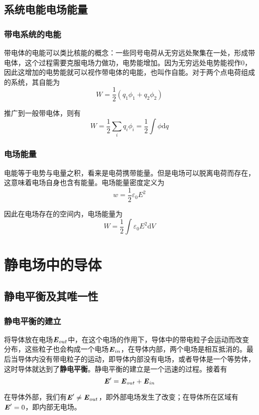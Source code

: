 \documentclass[UTF8,openany]{book}
\begin{document}
	\section{系统电能\quad 电场能量}
	\subsection{带电系统的电能}
	\par 带电体的电能可以类比核能的概念：一些同号电荷从无穷远处聚集在一处，形成带电体，这个过程需要克服电场力做功，电势能增加。因为无穷远处电势能视作0，因此这增加的电势能就可以视作带电体的电能，也叫作自能。对于两个点电荷组成的系统，其自能为
	$$W=\frac{1}{2}(q_1\phi_1+q_2\phi_2)$$
	\par 推广到一般带电体，则有
	$$W=\frac{1}{2}\sum_{i}q_i\phi_i=\frac{1}{2}\int\phi\mathrm{d}q$$
	\subsection{电场能量}
	\par 电能等于电势与电量之积，看来是电荷携带能量。但是电场可以脱离电荷而存在，这意味着电场自身也含有能量。电场能量密度定义为
	$$w=\frac{1}{2}\varepsilon_0E^2$$
	\par 因此在电场存在的空间内，电场能量为
	$$W=\frac{1}{2}\int\varepsilon_0E^2\mathrm{d}V$$
	
	\chapter{静电场中的导体}
	\section{静电平衡及其唯一性}
	\subsection{静电平衡的建立}
	\par 将导体放在电场$\textbf{\textit{E}}_{out}$中，在这个电场的作用下，导体中的带电粒子会运动而改变分布，这些粒子也会构成一个电场$\textbf{\textit{E}}_{in}$，在导体内部，两个电场是相互抵消的。最后当导体内没有带电粒子的运动，即导体内部没有电场，或者导体是一个等势体，这时导体就达到了\textbf{静电平衡}。静电平衡的建立是一个迅速的过程。接着有
	$$\textbf{\textit{E}}'=\textbf{\textit{E}}_{out}+\textbf{\textit{E}}_{in}$$
	\par 在导体外部，我们有$\textbf{\textit{E}}'\neq\textbf{\textit{E}}_{out}$，即外部电场发生了改变；在导体所在区域有$\textbf{\textit{E}}'=0$，即内部无电场。
\end{document}
